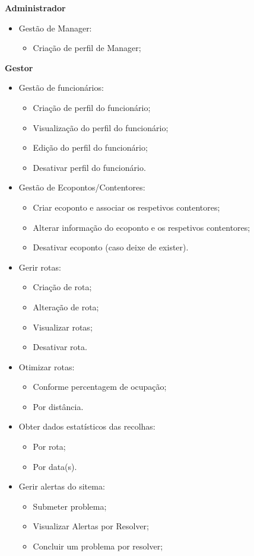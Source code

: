 \documentclass{scrreprt}
\begin{document}
	\textbf{Administrador}
	\begin{itemize}
		\item Gestão de Manager:
		\begin{itemize}
			\item Criação de perfil de Manager;
		\end{itemize}
	\end{itemize}	
	\textbf{Gestor}
	\begin{itemize}
		\item Gestão de funcionários:
		\begin{itemize}
			\item Criação de perfil do funcionário;
			\item Visualização do perfil do funcionário;
			\item Edição do perfil do funcionário;
			\item Desativar perfil do funcionário.
		\end{itemize}
		\item Gestão de Ecopontos/Contentores:
		\begin{itemize}
			\item Criar ecoponto e associar os respetivos contentores;
			\item Alterar informação do ecoponto e os respetivos contentores;
			\item Desativar ecoponto (caso deixe de exister).
		\end{itemize}
		\item Gerir rotas:
		\begin{itemize}
			\item Criação de rota;
			\item Alteração de rota;
			\item Visualizar rotas;
			\item Desativar rota.
		\end{itemize}
		\item Otimizar rotas:
		\begin{itemize}
			\item Conforme percentagem de ocupação;
			\item Por distância.
		\end{itemize}
		\item Obter dados estatísticos das recolhas:
		\begin{itemize}
			\item Por rota;
			\item Por data(s).
		\end{itemize}
		\item Gerir alertas do sitema:
		\begin{itemize}
			\item Submeter problema;
			\item Visualizar Alertas por Resolver;
			\item Concluir um problema por resolver;
		\end{itemize}
	\end{itemize}
	
\end{document}
